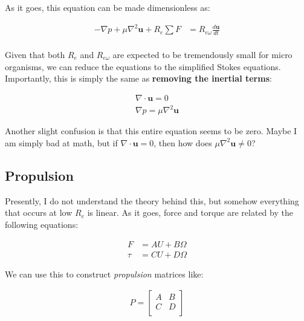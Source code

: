 As it goes, this equation can be made dimensionless as: 

\begin{equation} \label{NS4}
\begin{split}
-\nabla p + \mu \nabla^2\mathbf{u} + R_e\sum F & = R_{e\omega} \frac{d\mathbf{u}}{dt} \\
\end{split}
\end{equation}

Given that both $R_e$ and $R_{e\omega}$ are expected to be tremendously small for micro organisms, we can reduce the equations to the simplified Stokes equations. Importantly, this is simply the same as \textbf{removing the inertial terms}: 

\begin{equation} \label{S1}
\begin{split}
\nabla \cdot \mathbf{u} = 0 \\
\nabla p = \mu \nabla^2\mathbf{u} 
\end{split}
\end{equation}

Another slight confusion is that this entire equation seems to be zero. Maybe I am simply bad at math, but if $\nabla \cdot \mathbf{u} = 0$, then how does $\mu \nabla^2\mathbf{u} \neq 0$?

\subsection{Propulsion}


Presently, I do not understand the theory behind this, but somehow everything that occurs at low $R_e$ is linear. As it goes, force and torque are related by the following equations: 

\begin{equation} \label{Prop1}
\begin{split}
F &= AU + B\Omega \\
\tau &= CU + D\Omega
\end{split}
\end{equation}

We can use this to construct \textit{propulsion} matrices like: 

\begin{align}
P = 
\begin{bmatrix} 
A & B  \\
C & D  \\
\end{bmatrix}
\end{align}

